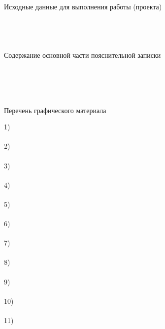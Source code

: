 \begin{titlepage}
\begin{flushleft}
			\normalsize\\
		\vspace{.3cm}
		Исходные данные для выполнения работы (проекта)\\
		\hrulefill\\
		\hrulefill\\
		\hrulefill\\
		\hrulefill\\
		Содержание основной части пояснительной записки\\
		\hrulefill\\
		\hrulefill\\
		\hrulefill\\
		\hrulefill\\

		\begin{center}
	    	Перечень графического материала\\
		\end{center}
		1) \hrulefill\\
		\hrulefill\\
		2) \hrulefill\\
		\hrulefill\\
		3) \hrulefill\\
		\hrulefill\\
		4) \hrulefill\\
		\hrulefill\\
		5) \hrulefill\\
		\hrulefill\\
		6) \hrulefill\\
		\hrulefill\\
		7) \hrulefill\\
		\hrulefill\\
		8) \hrulefill\\
		\hrulefill\\
		9) \hrulefill\\
		\hrulefill\\
		10) \hrulefill\\
		\hrulefill\\
		11) \hrulefill\\
		\hrulefill\\


\end{flushleft}
\end{titlepage}
